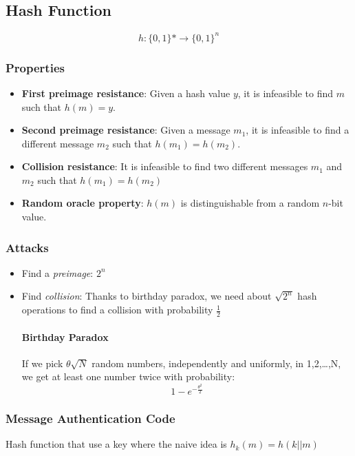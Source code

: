 \subsection{Hash Function}

$$h:\{0,1\}*\rightarrow\{0,1\}^n$$

\subsubsection{Properties}

\begin{itemize}
    \item \textbf{First preimage resistance}: Given a hash value $y$, it is infeasible to
        find $m$ such that $h(m) = y$.
    \item \textbf{Second preimage resistance}: Given a message $m_1$, it is infeasible
        to find a different message $m_2$ such that $h(m_1)=h(m_2)$.
    \item \textbf{Collision resistance}: It is infeasible to find two different messages
        $m_1$ and $m_2$ such that $h(m_1)=h(m_2)$
    \item \textbf{Random oracle property}: $h(m)$ is distinguishable from a
        random $n$-bit value.
\end{itemize}

\subsubsection{Attacks}
\begin{itemize}
    \item Find a \textit{preimage}: $2^n$
    \item Find \textit{collision}: Thanks to birthday paradox,
        we need about $\sqrt{2^n}$ hash operations to find a
        collision with probability $\frac{1}{2}$

        \paragraph{Birthday Paradox} If we pick $\theta\sqrt{N}$ random numbers,
        independently and uniformly, in {1,2,\ldots,N}, we get at least one number twice
        with probability:
        $$1-e^{-\frac{\theta^2}{2}}$$
\end{itemize}

\subsubsection{Message Authentication Code} 
Hash function that use a key where the naive idea is $h_k(m) = h(k||m)$

